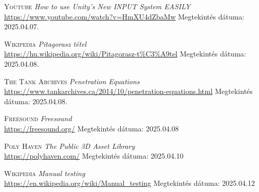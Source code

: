 \documentclass[
]{thesis-ekf}
\theoremstyle{definition}
\theoremstyle{remark}
\begin{document}
\begin{thebibliography}{55}
    \textsc{Youtube} \emph{How to use Unity's New INPUT System EASILY} \\
    \url{https://www.youtube.com/watch?v=HmXU4dZbaMw} Megtekintés dátuma: 2025.04.07.

    \textsc{Wikipedia} \emph{Pitagorasz tétel} \\
    \url{https://hu.wikipedia.org/wiki/Pitagorasz-t\%C3\%A9tel} Megtekintés dátuma: 2025.04.08.

    \textsc{The Tank Archives} \emph{Penetration Equations} \\
    \url{https://www.tankarchives.ca/2014/10/penetration-equations.html} Megtekintés dátuma: 2025.04.08.

    \textsc{Freesound} \emph{Freesound} \\
    \url{https://freesound.org/} Megtekintés dátuma: 2025.04.08

    \textsc{Poly Haven} \emph{The Public 3D Asset Library} \\
    \url{https://polyhaven.com/} Megtekintés dátuma: 2025.04.10

    \textsc{Wikipedia} \emph{Manual testing} \\
    \url{https://en.wikipedia.org/wiki/Manual_testing} Megtekintés dátuma: 2025.04.12

\end{thebibliography}


\end{document}
